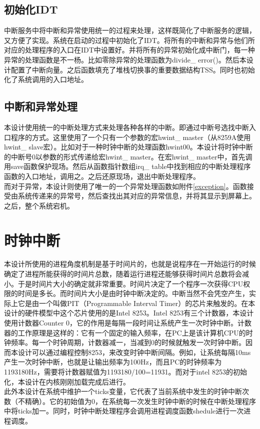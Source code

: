 \documentclass[UTF8,nofonts,cs4size]{ctexrep}
\begin{document}
\subsection{初始化IDT}
中断服务中将中断和异常使用统一的过程来处理，这样既简化了中断服务的逻辑，又方便了实现。系统在启动的过程中初始化了IDT。将所有的中断和异常与他们所对应的处理程序的入口在IDT中设置好。并将所有的异常初始化成中断门，每一种异常的处理函数是不一杨。比如零除异常的处理函数为divide\_ error()。然后本设计配置了中断向量。之后函数填充了堆栈切换事的重要数据结构TSS。同时也初始化了系统调用的入口地址。
\subsection{中断和异常处理}
本设计使用统一的中断处理方式来处理各种各样的中断。即通过中断号选找中断入口程序的方式。这里使用了一个只有一个参数的宏hwint\_ master（从8259A使用hwint\_ slave宏）。比如对于一种时钟中断的处理函数hwint00。本设计将时钟中断的中断号0以参数的形式传递给宏hwint\_ master。在宏hwint\_ master中，首先调用save函数保护现场。然后从函数指针数组irq\_ table中找到相应的中断处理程序函数的入口地址，调用之。之后还原现场，退出中断处理程序。
\\
\indent  而对于异常，本设计则使用了唯一的一个异常处理函数如附件\ref{exception}。函数接受由系统传递来的异常号，然后查找出其对应的异常信息，并将其显示到屏幕上。之后，整个系统宕机。
\section{时钟中断}
本设计所使用的进程角度机制是基于时间片的，也就是说程序在一开始运行的时候确定了进程所能获得的时间片总数，随着运行进程还能够获得时间片总数将会减小。于是时间片大小的确定就非常重要。时间片决定了一个程序一次获得CPU权限的时间是多长。而时间片大小是由时钟中断决定的。中断当然不会凭空产生，实际上它是由一个叫做PIT（Programmable Interval Timer）的芯片来触发的。在本设计的硬件模型中这个芯片使用的是Intel 8253。Intel 8253有三个计数器，本设计使用计数器Counter 0，它的作用是每隔一段时间让系统产生一次时钟中断。计数器的工作原理是这样的：它有一个固定的输入频率，在PC上是该计算机CPU的时钟频率。每一个时钟周期，计数器减一，当减到0的时候就触发一次时钟中断。因而本设计可以通过编程控制8253，来改变时钟中断间隔。例如，让系统每隔10ms产生一次时钟中断，也就是让输出频率为100Hz，而且PC的时钟频率为1193180Hz，需要将计数器赋值为1193180/100=11931。而对于intel 8253的初始化，本设计在内核刚刚加载完成后进行。
\\
\indent 
此外本设计在系统中维护一个ticks变量，它代表了当前系统中发生的时钟中断次数（不精确）。它的初始值为0，在系统每一次发生时钟中断的时候在中断处理程序中将ticks加一。同时，时钟中断处理程序会调用进程调度函数shedule进行一次进程调度。
\end{document}
